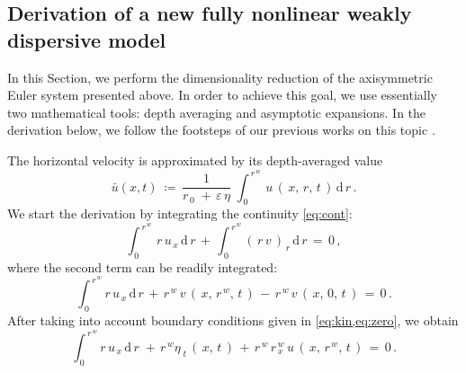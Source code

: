 \documentclass[alpha-refs, 12pt]{wiley-article}
\newcommand{\ud}{\mathrm{d}}
\newcommand{\eps}{\varepsilon}
\begin{document}
\subsection{Derivation of a new fully nonlinear weakly dispersive model}

In this Section, we perform the dimensionality reduction of the axisymmetric Euler system presented above. In order to achieve this goal, we use essentially two mathematical tools: depth averaging and asymptotic expansions. In the derivation below, we follow the footsteps of our previous works on this topic \citep{Dutykh2011a, Clamond2015c, Khakimzyanov2019, Clamond2024}.

The horizontal velocity is approximated by its depth-averaged value
\begin{equation}\label{eq:avg}
  \bar{u}(x,t)\ \coloneqq\ \frac{1}{r_{\,0}\;+\,\eps\,\eta}\;\displaystyle \int_{\,0}^{\,r^{\,w}}\,u\,(\,x,\,r,\,t\,)\,\ud\,r\,.
\end{equation}
We start the derivation by integrating the continuity \cref{eq:cont}:
\begin{equation*}
  \int_{\,0}^{\,r^{\,w}}\,r\,u_{\,x}\,\ud\,r \,+\, \int_{\,0}^{\,r^{\,w}}(\,r\,v\,)_{\,r}\,\ud\,r\,=\,0\,,
\end{equation*}
where the second term can be readily integrated:
\begin{equation*}
  \int_{\,0}^{\,r^{\,w}}r\,u_{\,x}\,\ud\,r\,+\, r^{\,w}\,v\,(\,x,\,r^{\,w},\,t\,)\,-\,r^{\,w}\,v\,(\,x,\,0,\,t\,)\,=\,0\,.
\end{equation*}
After taking into account boundary conditions given in \cref{eq:kin,eq:zero}, we obtain
\begin{equation}\label{eq:contint}
  \int_{\,0}^{\,r^{\,w}}r\,u_{\,x}\,\ud\,r\;+\,r^{\,w} \eta_{\;t}\,(\,x,\,t\,)\,+\,r^{\,w}\,r_{\,x}^{\,w}\,u\,(\,x,\,r^{\,w},\,t\,)\,=\,0\,.
\end{equation}
\end{document}
